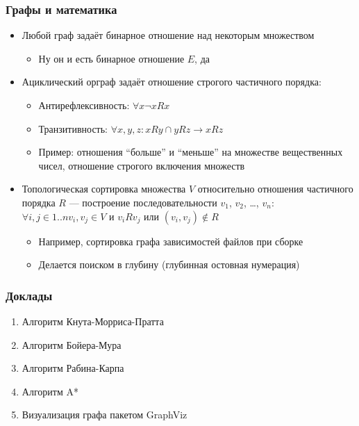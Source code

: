 \documentclass{../../slides-style}
\begin{document}
    \begin{frame}
        \frametitle{Графы и математика}
        \begin{itemize}
            \item Любой граф задаёт бинарное отношение над некоторым множеством
            \begin{itemize}
                \item Ну он и есть бинарное отношение $E$, да
            \end{itemize}
            \item Ациклический орграф задаёт отношение строгого частичного порядка:
            \begin{itemize}
                \item Антирефлексивность: $\forall x \neg xRx$
                \item Транзитивность: $\forall x,y,z: xRy \cap yRz \rightarrow xRz$
                \item Пример: отношения ``больше'' и ``меньше'' на множестве вещественных чисел, отношение строгого включения множеств
            \end{itemize}
            \item Топологическая сортировка множества $V$ относительно отношения частичного порядка $R$ --- построение последовательности $v_1$, $v_2$, …, $v_n$: 
            $\forall i,j \in 1..n v_i, v_j \in V$ и $v_iRv_j$ или $(v_i, v_j) \not\in R$
            \begin{itemize}
                \item Например, сортировка графа зависимостей файлов при сборке
                \item Делается поиском в глубину (глубинная остовная нумерация)
            \end{itemize}
        \end{itemize}
    \end{frame}

    \begin{frame}
        \frametitle{Доклады}
        \begin{enumerate}
            \item Алгоритм Кнута-Морриса-Пратта
            \item Алгоритм Бойера-Мура
            \item Алгоритм Рабина-Карпа
            \item Алгоритм A*
            \item Визуализация графа пакетом GraphViz
        \end{enumerate}
    \end{frame}
\end{document}
